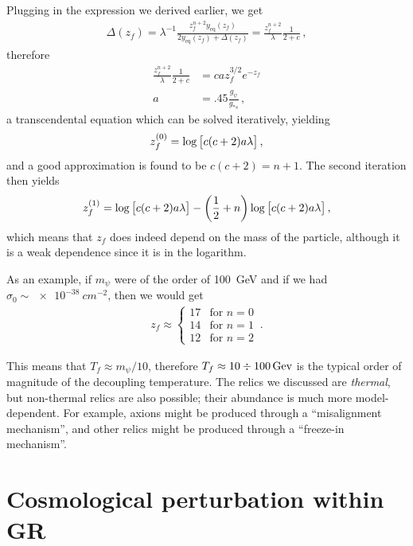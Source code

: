 \documentclass[main.tex]{subfiles}
\begin{document}
Plugging in the expression we derived earlier, we get 
%
\begin{align}
\Delta(z_f) = \lambda^{-1} \frac{z_f^{n+2} y_{\text{eq}}(z_f)}{2 y _{\text{eq}}(z_f) + \Delta (z_f)} = \frac{z_f^{n+2}}{\lambda } \frac{1}{2 + c}
\,,
\end{align}
%
therefore 
%
\begin{align}
\frac{z_f^{n+2}}{\lambda } \frac{1}{2 + c}
&= c a z_f^{3/2} e^{-z_f}  \\
a &= \num{.45} \frac{g_\psi }{g_{*s}}
\,,
\end{align}
%
a transcendental equation which can be solved iteratively, yielding 
%
\begin{align}
z_f^{(0)} = \log \qty[c (c+2) a \lambda ]
\,,
\end{align}
%
and a good approximation is found to be \(c ( c+ 2) = n+1\). 
The second iteration then yields 
%
\begin{align}
z_f^{(1)} = \log \qty[c (c+2) a \lambda ] - \qty( \frac{1}{2} + n) \log \qty[c (c+2) a \lambda ]
\,,
\end{align}
%
which means that \(z_f\) does indeed depend on the mass of the particle, although it is a weak dependence since it is in the logarithm. 

As an example, if \(m_\psi \) were of the order of \SI{100}{GeV} and if we had \(\sigma_0 \sim \SI{e-38}{cm^{-2}}\), then we would get 
%
\begin{align}
z_f \approx \begin{cases}
    17 & \text{for } n=0 \\
    14 & \text{for } n=1 \\
    12 & \text{for } n=2 
\end{cases}
\,.
\end{align}

This means that \(T_f \approx m_\psi / 10\), therefore \(T_f \approx 10 \divisionsymbol \SI{100}{Gev}\) is the typical order of magnitude of the decoupling temperature. 
The relics we discussed are \emph{thermal}, but non-thermal relics are also possible; their abundance is much more model-dependent. 
For example, axions might be produced through a ``misalignment mechanism'', and other relics might be produced through a ``freeze-in mechanism''.

\chapter{Cosmological perturbation within GR}
\end{document}
